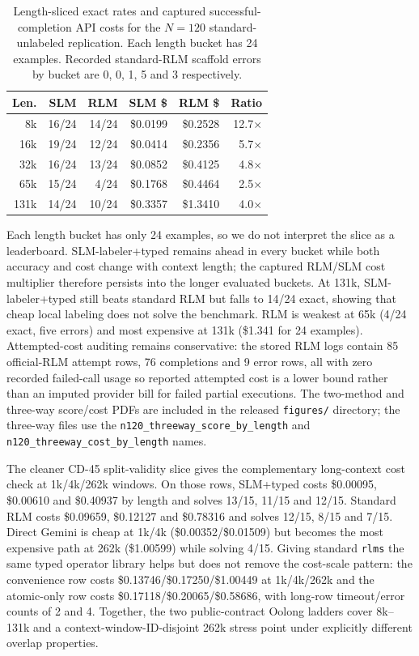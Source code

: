 \begin{table}[t]
\centering
\small
\setlength{\tabcolsep}{2.7pt}
\begin{tabular}{@{}rrrrrr@{}}
\toprule
\textbf{Len.} & \textbf{SLM} & \textbf{RLM} & \textbf{SLM \$} & \textbf{RLM \$} & \textbf{Ratio} \\
\midrule
8k & 16/24 & 14/24 & \$0.0199 & \$0.2528 & 12.7$\times$ \\
16k & 19/24 & 12/24 & \$0.0414 & \$0.2356 & 5.7$\times$ \\
32k & 16/24 & 13/24 & \$0.0852 & \$0.4125 & 4.8$\times$ \\
65k & 15/24 & 4/24 & \$0.1768 & \$0.4464 & 2.5$\times$ \\
131k & 14/24 & 10/24 & \$0.3357 & \$1.3410 & 4.0$\times$ \\
\bottomrule
\end{tabular}
\caption{Length-sliced exact rates and captured successful-completion API costs for the $N=120$ standard-unlabeled replication. Each length bucket has 24 examples. Recorded standard-RLM scaffold errors by bucket are 0, 0, 1, 5 and 3 respectively.}
\label{tab:supp-oolong-standard-n120-length}
\end{table}

Each length bucket has only 24 examples, so we do not interpret the slice as a leaderboard. SLM-labeler+typed remains ahead in every bucket while both accuracy and cost change with context length; the captured RLM/SLM cost multiplier therefore persists into the longer evaluated buckets. At 131k, SLM-labeler+typed still beats standard RLM but falls to 14/24 exact, showing that cheap local labeling does not solve the benchmark. RLM is weakest at 65k (4/24 exact, five errors) and most expensive at 131k (\$1.341 for 24 examples). Attempted-cost auditing remains conservative: the stored RLM logs contain 85 official-RLM attempt rows, 76 completions and 9 error rows, all with zero recorded failed-call usage so reported attempted cost is a lower bound rather than an imputed provider bill for failed partial executions. The two-method and three-way score/cost PDFs are included in the released \texttt{figures/} directory; the three-way files use the \texttt{n120\_threeway\_score\_by\_length} and \texttt{n120\_threeway\_cost\_by\_length} names.

The cleaner CD-45 split-validity slice gives the complementary long-context cost check at 1k/4k/262k windows. On those rows, SLM+typed costs \$0.00095, \$0.00610 and \$0.40937 by length and solves 13/15, 11/15 and 12/15. Standard RLM costs \$0.09659, \$0.12127 and \$0.78316 and solves 12/15, 8/15 and 7/15. Direct Gemini is cheap at 1k/4k (\$0.00352/\$0.01509) but becomes the most expensive path at 262k (\$1.00599) while solving 4/15. Giving standard \texttt{rlms} the same typed operator library helps but does not remove the cost-scale pattern: the convenience row costs \$0.13746/\$0.17250/\$1.00449 at 1k/4k/262k and the atomic-only row costs \$0.17118/\$0.20065/\$0.58686, with long-row timeout/error counts of 2 and 4. Together, the two public-contract Oolong ladders cover 8k--131k and a context-window-ID-disjoint 262k stress point under explicitly different overlap properties.

